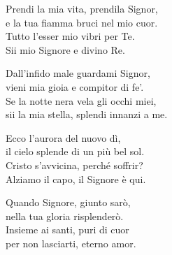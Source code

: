 
\strofa Prendi la mia vita, prendila Signor,\\
e la tua fiamma bruci nel mio cuor.\\
Tutto l'esser mio vibri per Te.\\
Sii mio Signore e divino Re.

\spazio


\spazio

\strofa Dall'infido male guardami Signor,\\
vieni mia gioia e compitor di fe'.\\
Se la notte nera vela gli occhi miei,\\
sii la mia stella, splendi innanzi a me.

\spazio


\spazio

\strofa Ecco l'aurora del nuovo dì,\\
il cielo splende di un più bel sol.\\
Cristo s'avvicina, perché soffrir?\\
Alziamo il capo, il Signore è qui.

\spazio


\spazio

\strofa Quando Signore, giunto sarò,\\
nella tua gloria risplenderò.\\
Insieme ai santi, puri di cuor\\
per non lasciarti, eterno amor.

\spazio

